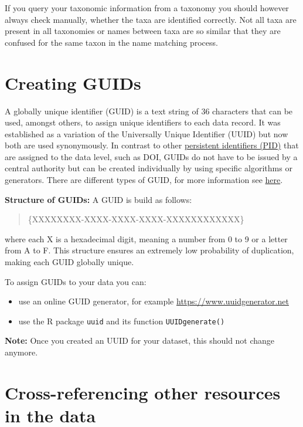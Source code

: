 \documentclass[
  oneside]{book}
\begin{document}
If you query your taxonomic information from a taxonomy you should however always check manually, whether the taxa are identified correctly. Not all taxa are present in all taxonomies or names between taxa are so similar that they are confused for the same taxon in the name matching process.

\section{Creating GUIDs}\label{GUIDcreation}

A globally unique identifier (GUID) is a text string of 36 characters that can be used, amongst others, to assign unique identifiers to each data record. It was established as a variation of the Universally Unique Identifier (UUID) but now both are used synonymously. In contrast to other \hyperref[PID]{persistent identifiers (PID)} that are assigned to the data level, such as DOI, GUIDs do not have to be issued by a central authority but can be created individually by using specific algorithms or generators. There are different types of GUID, for more information see \href{https://www.techtarget.com/searchwindowsserver/definition/GUID-global-unique-identifier}{here}.

\textbf{Structure of GUIDs:} A GUID is build as follows:

\begin{quote}
\{XXXXXXXX-XXXX-XXXX-XXXX-XXXXXXXXXXXX\}
\end{quote}

where each X is a hexadecimal digit, meaning a number from 0 to 9 or a letter from A to F. This structure ensures an extremely low probability of duplication, making each GUID globally unique.

To assign GUIDs to your data you can:

\begin{itemize}
\item
  use an online GUID generator, for example \url{https://www.uuidgenerator.net}
\item
  use the R package \texttt{uuid}\autocite{R-uuid} and its function \texttt{UUIDgenerate()}
\end{itemize}

\textbf{Note:} Once you created an UUID for your dataset, this should not change anymore.

\section{Cross-referencing other resources in the data}\label{crossref-in-data}
\end{document}
